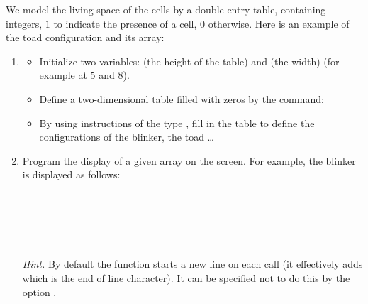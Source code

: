 \documentclass[11pt,class=report,crop=false]{standalone}
\begin{document}
\begin{activite}[Display]

We model the living space of the cells by a double entry table, containing integers, $1$ to indicate the presence of a cell, $0$ otherwise. Here is an example of the \og{}toad\fg{} configuration and its array:


\begin{enumerate}
  \item 
  \begin{itemize}
    \item Initialize two variables:  (the height of the table) and  (the width) (for example at $5$ and $8$).
    
    \item Define a two-dimensional table filled with zeros by the command:  
    
    \item By using instructions of the type , fill in the table to define the configurations of the blinker, the toad \ldots
  \end{itemize}
  
  \item Program the display of a given array on the screen. 
  For example, the blinker is displayed as follows:
  
\begin{center}
\\
\\
\\
\\
\end{center}

  \emph{Hint.} By default the  function starts a new line on each call (it effectively adds  which is the end of line character). It can be specified not to do this by the option .
  
\end{enumerate}
\end{activite}



\end{document}
